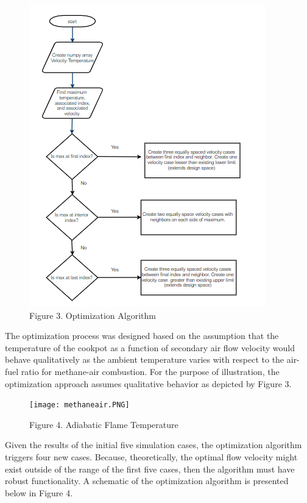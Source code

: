 \documentclass[3p,times,twocolumn]{elsarticle}
\begin{document}
\begin{figure}{\linewidth}
	\includegraphics[width=\linewidth]{algorithm.PNG}
	\caption{Figure 3. Optimization Algorithm}
\end{figure}



The optimization process was designed based on the assumption that the temperature of the cookpot as a function of secondary air flow velocity would behave qualitatively as the ambient temperature varies with respect to the air-fuel ratio for methane-air combustion. For the purpose of illustration, the optimization approach assumes qualitative behavior as depicted by Figure 3.

\begin{figure}{\linewidth}
	\texttt{[image: methaneair.PNG]}
	\caption{Figure 4. Adiabatic Flame Temperature}
\end{figure}


Given the results of the initial five simulation cases, the optimization algorithm triggers four new cases. Because, theoretically, the optimal flow velocity might exist outside of the range of the first five cases, then the algorithm must have robust functionality. A schematic of the optimization algorithm is presented below in Figure 4.
\end{document}
